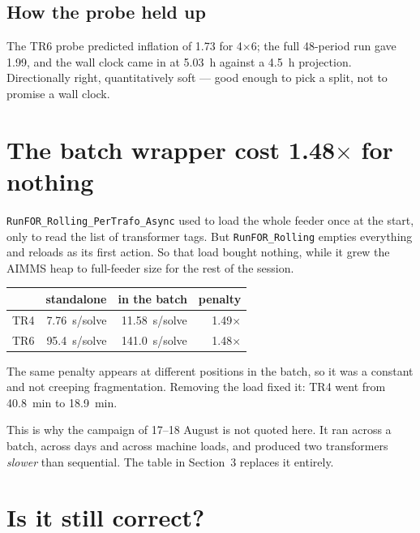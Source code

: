 \documentclass[11pt,a4paper]{article}
\begin{document}
\subsection{How the probe held up}

The TR6 probe predicted inflation of 1.73 for 4$\times$6; the full 48-period run
gave 1.99, and the wall clock came in at \SI{5.03}{\hour} against a
\SI{4.5}{\hour} projection. Directionally right, quantitatively soft --- good
enough to pick a split, not to promise a wall clock.

\section{The batch wrapper cost 1.48$\times$ for nothing}

\texttt{RunFOR\_Rolling\_PerTrafo\_Async} used to load the whole feeder once at
the start, only to read the list of transformer tags. But
\texttt{RunFOR\_Rolling} empties everything and reloads as its first action. So
that load bought nothing, while it grew the AIMMS heap to full-feeder size for
the rest of the session.

\begin{center}
\begin{tabular}{@{}l r r r@{}}
\toprule
 & \textbf{standalone} & \textbf{in the batch} & \textbf{penalty} \\
\midrule
TR4 & \SI{7.76}{\second}/solve & \SI{11.58}{\second}/solve & 1.49$\times$ \\
TR6 & \SI{95.4}{\second}/solve & \SI{141.0}{\second}/solve & 1.48$\times$ \\
\bottomrule
\end{tabular}
\end{center}

The same penalty appears at different positions in the batch, so it was a
constant and not creeping fragmentation. Removing the load fixed it: TR4 went
from \SI{40.8}{\minute} to \SI{18.9}{\minute}.

This is why the campaign of 17--18 August is not quoted here. It ran across a
batch, across days and across machine loads, and produced two transformers
\emph{slower} than sequential. The table in Section~3 replaces it entirely.

\section{Is it still correct?}
\end{document}
